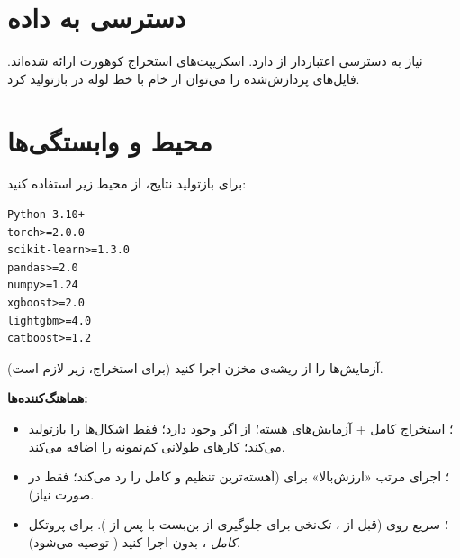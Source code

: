 \section{دسترسی به داده}

 نیاز به دسترسی اعتباردار از  دارد. اسکریپت‌های استخراج کوهورت ارائه شده‌اند. فایل‌های  پردازش‌شده را می‌توان از  خام با خط لوله در \texttt{} بازتولید کرد.

\section{محیط و وابستگی‌ها}

برای بازتولید نتایج، از محیط زیر استفاده کنید:

\begin{latin}\begin{lstlisting}
Python 3.10+
torch>=2.0.0
scikit-learn>=1.3.0
pandas>=2.0
numpy>=1.24
xgboost>=2.0
lightgbm>=4.0
catboost>=1.2
\end{lstlisting}\end{latin}

آزمایش‌ها را از ریشه‌ی مخزن اجرا کنید (برای استخراج،  زیر \texttt{} لازم است).

\textbf{هماهنگ‌کننده‌ها:}
\begin{itemize}
  \item \texttt{}؛ استخراج کامل + آزمایش‌های هسته؛ از \texttt{} اگر \texttt{} وجود دارد؛ \texttt{} فقط اشکال‌ها را بازتولید می‌کند؛ \texttt{} کارهای طولانی کم‌نمونه را اضافه می‌کند.
  \item \texttt{}؛ اجرای مرتب «ارزش‌بالا» برای  (آهسته‌ترین تنظیم  و  کامل را رد می‌کند؛ \texttt{} فقط در صورت نیاز).
  \item \texttt{}؛  سریع روی  (قبل از ،  تک‌نخی برای جلوگیری از بن‌بست  با  پس از ). برای پروتکل \emph{کامل} ، بدون \texttt{} اجرا کنید ( توصیه می‌شود).
\end{itemize}

